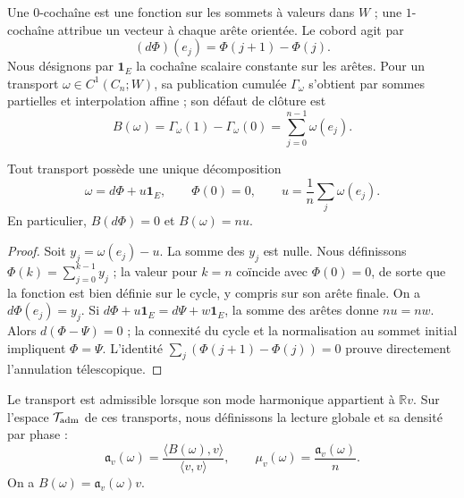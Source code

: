 Une \(0\)-cochaîne est une fonction sur les sommets à valeurs dans \(W\) ; une \(1\)-cochaîne attribue un vecteur à chaque arête orientée. Le cobord agit par
\[
 (d\Phi)(e_j)=\Phi(j+1)-\Phi(j).
\]
Nous désignons par \(\mathbf1_E\) la cochaîne scalaire constante sur les arêtes. Pour un transport \(\omega\in C^1(C_n;W)\), sa publication cumulée \(\Gamma_\omega\) s'obtient par sommes partielles et interpolation affine ; son défaut de clôture est
\begin{equation}
 B(\omega)=\Gamma_\omega(1)-\Gamma_\omega(0)
 =\sum_{j=0}^{n-1}\omega(e_j).
 \label{vii:vii:eq:observador-defecto}
\end{equation}

\begin{theorem}
\label{vii:vii:thm:observador-descomposicion}
Tout transport possède une unique décomposition
\[
 \omega=d\Phi+u\mathbf1_E,\qquad \Phi(0)=0,
 \qquad u=\frac1n\sum_j\omega(e_j).
\]
En particulier, \(B(d\Phi)=0\) et \(B(\omega)=nu\).
\end{theorem}

\begin{proof}
Soit \(y_j=\omega(e_j)-u\). La somme des \(y_j\) est nulle. Nous définissons \(\Phi(k)=\sum_{j=0}^{k-1}y_j\) ; la valeur pour \(k=n\) coïncide avec \(\Phi(0)=0\), de sorte que la fonction est bien définie sur le cycle, y compris sur son arête finale. On a \(d\Phi(e_j)=y_j\). Si \(d\Phi+u\mathbf1_E=d\Psi+w\mathbf1_E\), la somme des arêtes donne \(nu=nw\). Alors \(d(\Phi-\Psi)=0\) ; la connexité du cycle et la normalisation au sommet initial impliquent \(\Phi=\Psi\). L'identité \(\sum_j(\Phi(j+1)-\Phi(j))=0\) prouve directement l'annulation télescopique.
\end{proof}

\begin{definition}
\label{vii:vii:def:observador-admisible}
Le transport est admissible lorsque son mode harmonique appartient à
\(\mathbb Rv\). Sur l'espace \(\mathcal T_{\rm adm}\) de ces
transports, nous définissons la lecture globale et sa densité par phase :
\begin{equation}
 \mathfrak a_v(\omega)
 =\frac{\langle B(\omega),v\rangle}{\langle v,v\rangle},
 \qquad
 \mu_v(\omega)=\frac{\mathfrak a_v(\omega)}n.
 \label{vii:vii:eq:observador-lectura}
\end{equation}
On a \(B(\omega)=\mathfrak a_v(\omega)v\).
\end{definition}

